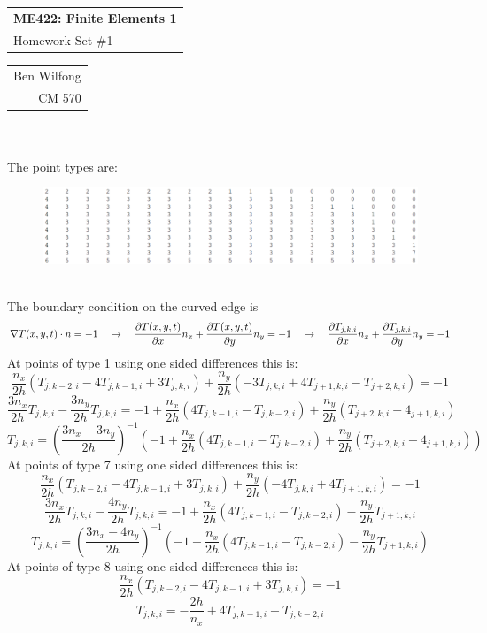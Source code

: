 \documentclass{amsart}
\def\name{Ben Wilfong} %
\def\CM{570} %
\begin{document}
	\noindent
	\thispagestyle{firststyle}
	\begin{tabular}{l}
		{\LARGE \textbf{ME422: Finite Elements 1} }\\
		{\Large Homework Set \#1}
	\end{tabular} \hfill \begin{tabular}{r}
		\name \\
		CM \CM
	\end{tabular}
	\noindent\makebox[\linewidth]{\rule{\textwidth}{1pt}} \\~\\
	The point types are:
	\begin{figure}[h]
		\centering
		\includegraphics[width=\textwidth]{pointTypes.png}
	\end{figure} \\
	The boundary condition on the curved edge is
	\[\nabla T(x,y,t)\cdot n = -1 \quad \rightarrow \quad \pdiff[T(x,y,t)]{x}n_x + \pdiff[T(x,y,t)]{y}n_y = -1 \quad \rightarrow \quad \pdiff[T_{j,k,i}]{x}n_x + \pdiff[T_{j,k,i}]{y}n_y = -1\]
	At points of type 1 using one sided differences this is:
	\[\frac{n_x}{2h}\left(T_{j,k-2,i} - 4T_{j,k-1,i} + 3T_{j,k,i}\right) + \frac{n_y}{2h}\left(-3T_{j,k,i} + 4T_{j+1,k,i} - T_{j+2,k,i}\right) = -1\]
	\[\frac{3n_x}{2h}T_{j,k,i} - \frac{3n_y}{2h}T_{j,k,i} = -1 + \frac{n_x}{2h}(4T_{j,k-1,i} - T_{j,k-2,i}) + \frac{n_y}{2h}(T_{j+2,k,i} - 4_{j+1,k,i})\]
	\[T_{j,k,i} = \left(\frac{3n_x-3n_y}{2h}\right)^{-1}\left(-1 + \frac{n_x}{2h}(4T_{j,k-1,i} - T_{j,k-2,i}) + \frac{n_y}{2h}(T_{j+2,k,i} - 4_{j+1,k,i})\right)\]
	\noindent At points of type 7 using one sided differences this is:
	\[\frac{n_x}{2h}\left(T_{j,k-2,i} - 4T_{j,k-1,i} + 3T_{j,k,i}\right) + \frac{n_y}{2h}\left(-4T_{j,k,i} + 4T_{j+1,k,i}\right) = -1\]
	\[\frac{3n_x}{2h}T_{j,k,i} - \frac{4n_y}{2h}T_{j,k,i} = -1 + \frac{n_x}{2h}(4T_{j,k-1,i} - T_{j,k-2,i}) - \frac{n_y}{2h}T_{j+1,k,i}\]
	\[T_{j,k,i} = \left(\frac{3n_x-4n_y}{2h}\right)^{-1}\left(-1 + \frac{n_x}{2h}(4T_{j,k-1,i} - T_{j,k-2,i}) - \frac{n_y}{2h}T_{j+1,k,i}\right)\]
	\noindent At points of type 8 using one sided differences this is:
	\[\frac{n_x}{2h}\left(T_{j,k-2,i} - 4T_{j,k-1,i} + 3T_{j,k,i}\right) = -1\]
	\[T_{j,k,i} = -\frac{2h}{n_x} + 4T_{j,k-1,i} - T_{j,k-2,i} \] \newpage
\end{document}
